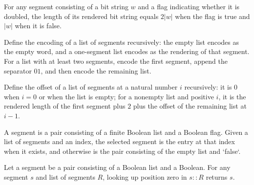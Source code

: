 \begin{lemma}
\label{Complexity.LogProg.length_render}
\leanok
{}
For any segment consisting of a bit string $w$ and a flag indicating whether it is
doubled, the length of its rendered bit string equals $2|w|$ when the flag is true and
$|w|$ when it is false.
\end{lemma}

\begin{definition}
\label{Complexity.LogProg.vword}
\leanok
{}
Define the encoding of a list of segments recursively: the empty list encodes as the
empty word, and a one-segment list encodes as the rendering of that segment. For a list
with at least two segments, encode the first segment, append the separator $01$, and
then encode the remaining list.
\end{definition}

\begin{definition}
\label{Complexity.LogProg.off}
\leanok
{}
Define the offset of a list of segments at a natural number $i$ recursively: it is $0$
when $i=0$ or when the list is empty; for a nonempty list and positive $i$, it is the
rendered length of the first segment plus $2$ plus the offset of the remaining list at
$i-1$.
\end{definition}

\begin{definition}
\label{Complexity.LogProg.seg}
\leanok
{}
A segment is a pair consisting of a finite Boolean list and a Boolean flag. Given a list
of segments and an index, the selected segment is the entry at that index when it
exists, and otherwise is the pair consisting of the empty list and `false`.
\end{definition}

\begin{lemma}
\label{Complexity.LogProg.seg_cons_zero}
\leanok
{}
Let a segment be a pair consisting of a Boolean list and a Boolean. For any segment $s$
and list of segments $R$, looking up position zero in $s :: R$ returns $s$.
\end{lemma}

